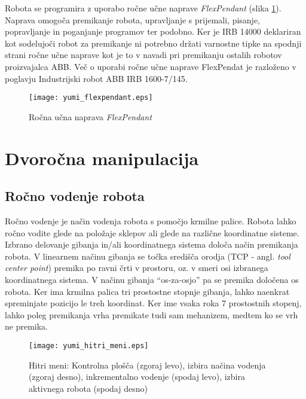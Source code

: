 Robota se programira z uporabo ročne učne naprave \emph{FlexPendant} (slika \ref{fig:yumi_flexpendant}). Naprava omogoča premikanje robota, upravljanje s prijemali, pisanje, popravljanje in poganjanje programov ter podobno. Ker je IRB 14000 deklariran kot sodelujoči robot za premikanje ni potrebno držati varnostne tipke na spodnji strani ročne učne naprave kot je to v navadi pri premikanju ostalih robotov proizvajalca ABB. Več o uporabi ročne učne naprave FlexPendat je razloženo v poglavju Industrijski robot ABB IRB 1600-7/145.


\begin{figure}[!hbt]
\centering
\texttt{[image: yumi\_flexpendant.eps]}
\caption{Ročna učna naprava \emph{FlexPendant}}
\label{fig:yumi_flexpendant}
\end{figure}


\section{Dvoročna manipulacija}



\subsection{Ročno vodenje robota}

Ročno vodenje je način vodenja robota s pomočjo krmilne palice. Robota lahko ročno vodite glede na položaje sklepov ali glede na različne koordinatne sisteme. Izbrano delovanje gibanja in/ali koordinatnega sistema določa način premikanja robota. V linearnem načinu gibanja se točka središča orodja (TCP - angl. \emph{tool center point}) premika po ravni črti v prostoru, oz. v smeri osi izbranega koordinatnega sistema. V načinu gibanja ``os-za-osjo'' pa se premika določena os robota. Ker ima krmilna palica tri prostostne stopnje gibanja, lahko naenkrat spreminjate pozicijo le treh koordinat. Ker ime vsaka roka 7 prostostnih stopenj, lahko poleg premikanja vrha premikate tudi sam mehanizem, medtem ko se vrh ne premika.

\begin{figure}[!hbt]
\centering
\texttt{[image: yumi\_hitri\_meni.eps]}
\caption{Hitri meni: Kontrolna plošča (zgoraj levo), izbira načina vodenja (zgoraj desno), inkrementalno vodenje (spodaj levo), izbira aktivnega robota (spodaj desno)}
\label{fig:yumi_hitri}
\end{figure}

